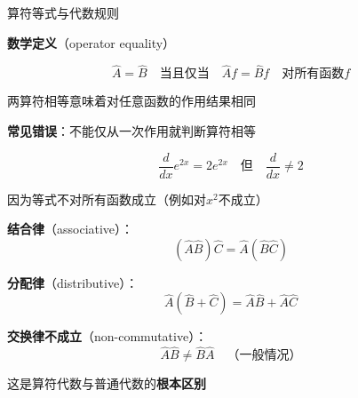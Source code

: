 \documentclass[aspectratio=169, 10pt]{beamer}
\begin{document}
\begin{frame}{算符等式与代数规则}
  
  \begin{iqbitemize}
    \item \textbf{数学定义}（operator equality）
    \end{iqbitemize}
      \[
        \hat{A} = \hat{B} \quad \text{当且仅当} \quad \hat{A}f = \hat{B}f \quad \text{对所有函数}f
      \]
    \begin{iqbitemize}
    \item 两算符相等意味着对任意函数的作用结果相同
    \item \textbf{常见错误}：不能仅从一次作用就判断算符相等
    \end{iqbitemize}
      \[
        \frac{d}{dx}e^{2x} = 2e^{2x} \quad \text{但} \quad \frac{d}{dx} \neq 2
      \]
    \begin{iqbitemize}
    \item 因为等式不对所有函数成立（例如对$x^2$不成立）
    \end{iqbitemize}
    \begin{iqbitemize}
    \item \textbf{结合律}（associative）：
    \[
      (\hat{A}\hat{B})\hat{C} = \hat{A}(\hat{B}\hat{C})
    \]
    \item \textbf{分配律}（distributive）：
    \[
      \hat{A}(\hat{B} + \hat{C}) = \hat{A}\hat{B} + \hat{A}\hat{C}
    \]
    \item \textbf{交换律不成立}（non-commutative）：
    \[
      \hat{A}\hat{B} \neq \hat{B}\hat{A} \quad \text{（一般情况）}
    \]
    \item 这是算符代数与普通代数的\textbf{根本区别}
    \end{iqbitemize}
    \iqbtinysep

\end{frame}
\end{document}
